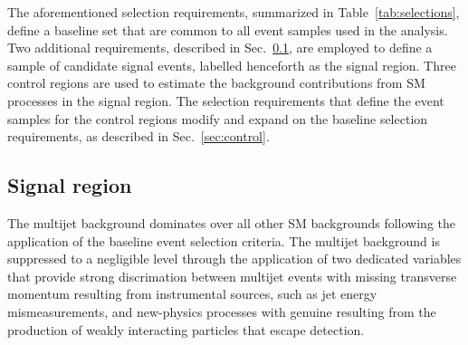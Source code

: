 The aforementioned selection requirements, summarized in
Table~\ref{tab:selections}, define a baseline set that are common to
all event samples used in the analysis. Two additional requirements,
described in Sec.~\ref{sec:signal}, are employed to define a sample of
candidate signal events, labelled henceforth as the signal
region. Three control regions are used to estimate the background
contributions from SM processes in the signal region. The selection
requirements that define the event samples for the control regions
modify and expand on the baseline selection requirements, as described
in Sec.~\ref{sec:control}.


\subsection{Signal region}
\label{sec:signal}

The multijet background dominates over all other SM backgrounds
following the application of the baseline event selection
criteria. The multijet background is suppressed to a negligible level
through the application of two dedicated variables that provide strong
discrimation between multijet events with missing transverse momentum
resulting from instrumental sources, such as jet energy
mismeasurements, and new-physics processes with genuine \ptvecmiss
resulting from the production of weakly interacting particles that
escape detection.

